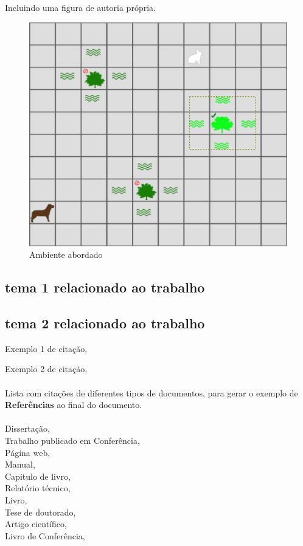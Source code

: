 Incluindo uma figura de autoria própria.
\begin{figure} [htb]
\begin{center}
	 \caption{\label{fig:ambiente}Ambiente abordado}
	    \includegraphics[scale=0.3]{imagens/revisao-bibliografica/ambiente.eps}
    \end{center}
\end{figure}

\subsection{tema 1 relacionado ao trabalho}



\subsection{tema 2 relacionado ao trabalho}


Exemplo 1 de citação, \cite{almeida2022}

Exemplo 2 de citação, \\ \\
Lista com citações de  diferentes tipos de documentos, para gerar o exemplo de\\ \textbf{Referências} ao final do documento.\\ \\
Dissertação, \cite{almeida2022}\\
Trabalho publicado em Conferência, \cite{cbsoft2023}\\
Página web, \cite{ferreira2020}\\
Manual, \cite{latex2023}\\
Capitulo de livro, \cite{mendes2019}\\
Relatório técnico, \cite{oliveira2020}\\
Livro, \cite{linden2012}\\
Tese de doutorado, \cite{rodrigues2021}\\
Artigo científico, \cite{silva2023}\\
Livro de Conferência, \cite{souza2022}


